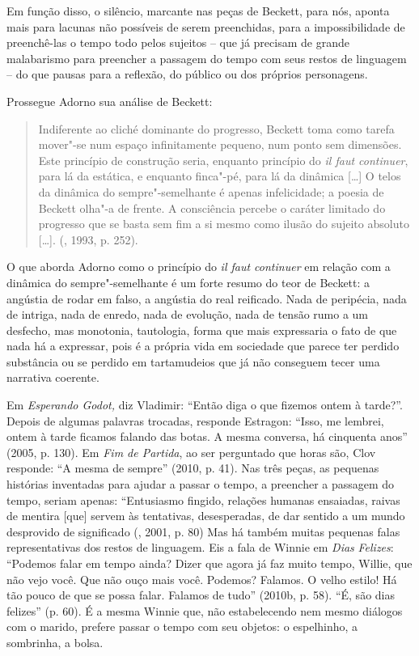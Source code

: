 Em função disso, o silêncio, marcante nas peças de Beckett, para nós,
aponta mais para lacunas não possíveis de serem preenchidas, para a
impossibilidade de preenchê-las o tempo todo pelos sujeitos -- que já
precisam de grande malabarismo para preencher a passagem do tempo com
seus restos de linguagem -- do que pausas para a reflexão, do público ou
dos próprios personagens.

Prossegue Adorno sua análise de Beckett:

\begin{quote}
Indiferente ao cliché dominante do progresso, Beckett toma como tarefa
mover"-se num espaço infinitamente pequeno, num ponto sem dimensões. Este
princípio de construção seria, enquanto princípio do \emph{il faut
continuer}, para lá da estática, e enquanto finca"-pé, para lá da
dinâmica [\ldots{}] O telos da dinâmica do sempre"-semelhante é
apenas infelicidade; a poesia de Beckett olha"-a de frente. A consciência
percebe o caráter limitado do progresso que se basta sem fim a si mesmo
como ilusão do sujeito absoluto [\ldots{}]. (, 1993, p.
252).
\end{quote}

O que aborda Adorno como o princípio do \emph{il faut continuer} em
relação com a dinâmica do sempre"-semelhante é um forte resumo do teor de
Beckett: a angústia de rodar em falso, a angústia do real reificado.
Nada de peripécia, nada de intriga, nada de enredo, nada de evolução,
nada de tensão rumo a um desfecho, mas monotonia, tautologia, forma que
mais expressaria o fato de que nada há a expressar, pois é a própria
vida em sociedade que parece ter perdido substância ou se perdido em
tartamudeios que já não conseguem tecer uma narrativa coerente.

Em \emph{Esperando Godot,} diz Vladimir: ``Então diga o que fizemos
ontem à tarde?''. Depois de algumas palavras trocadas, responde
Estragon: ``Isso, me lembrei, ontem à tarde ficamos falando das botas. A
mesma conversa, há cinquenta anos'' (2005, p. 130). Em \emph{Fim de
Partida}, ao ser perguntado que horas são, Clov responde: ``A mesma de
sempre'' (2010, p. 41). Nas três peças, as pequenas histórias inventadas
para ajudar a passar o tempo, a preencher a passagem do tempo, seriam
apenas: ``Entusiasmo fingido, relações humanas ensaiadas, raivas de
mentira [que] servem às tentativas, desesperadas, de dar sentido a
um mundo desprovido de significado (, 2001, p. 80) Mas há também
muitas pequenas falas representativas dos restos de linguagem. Eis a
fala de Winnie em \emph{Dias} \emph{Felizes}: ``Podemos falar em tempo
ainda? Dizer que agora já faz muito tempo, Willie, que não vejo você.
Que não ouço mais você. Podemos? Falamos. O velho estilo! Há tão pouco
de que se possa falar. Falamos de tudo'' (2010b, p. 58). ``É, são dias
felizes'' (p. 60). É a mesma Winnie que, não estabelecendo nem mesmo
diálogos com o marido, prefere passar o tempo com seu objetos: o
espelhinho, a sombrinha, a bolsa.

